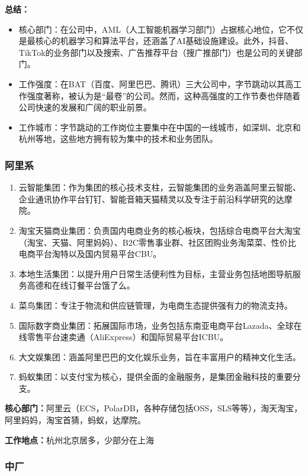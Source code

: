 \textbf{总结：}
\begin{itemize}
    \item 核心部门：在公司中，AML（人工智能机器学习部门）占据核心地位，它不仅是最核心的机器学习和算法平台，还涵盖了AI基础设施建设。此外，抖音、TikTok的业务部门以及搜索、广告推荐平台（搜广推部门）也是公司的关键部门。
    \item 工作强度：在BAT（百度、阿里巴巴、腾讯）三大公司中，字节跳动以其高工作强度著称，被认为是“最卷”的公司。然而，这种高强度的工作节奏也伴随着公司快速的发展和广阔的职业前景。
    \item 工作城市：字节跳动的工作岗位主要集中在中国的一线城市，如深圳、北京和杭州等地，这些地方拥有较为集中的技术和业务团队。
\end{itemize}

\subsubsection{阿里系}
\begin{enumerate}
    \item 云智能集团：作为集团的核心技术支柱，云智能集团的业务涵盖阿里云智能、企业通讯协作平台钉钉、智能音箱天猫精灵以及专注于前沿科学研究的达摩院。
    \item 淘宝天猫商业集团：负责国内电商业务的核心板块，包括综合电商平台大淘宝（淘宝、天猫、阿里妈妈）、B2C零售事业群、社区团购业务淘菜菜、性价比电商平台淘特以及国内贸易平台CBU。
    \item 本地生活集团：以提升用户日常生活便利性为目标，主营业务包括地图导航服务高德和在线订餐平台饿了么。
    \item 菜鸟集团：专注于物流和供应链管理，为电商生态提供强有力的物流支持。
    \item 国际数字商业集团：拓展国际市场，业务包括东南亚电商平台Lazada、全球在线零售平台速卖通（AliExpress）和国际贸易平台ICBU。
    \item 大文娱集团：涵盖阿里巴巴的文化娱乐业务，旨在丰富用户的精神文化生活。
    \item 蚂蚁集团：以支付宝为核心，提供全面的金融服务，是集团金融科技的重要分支。
\end{enumerate}

\textbf{核心部门：}阿里云（ECS，PolarDB，各种存储包括OSS，SLS等等），淘天淘宝，阿里妈妈，淘宝首猜，蚂蚁，达摩院。

\textbf{工作地点：}杭州北京居多，少部分在上海

\subsubsection{中厂}

